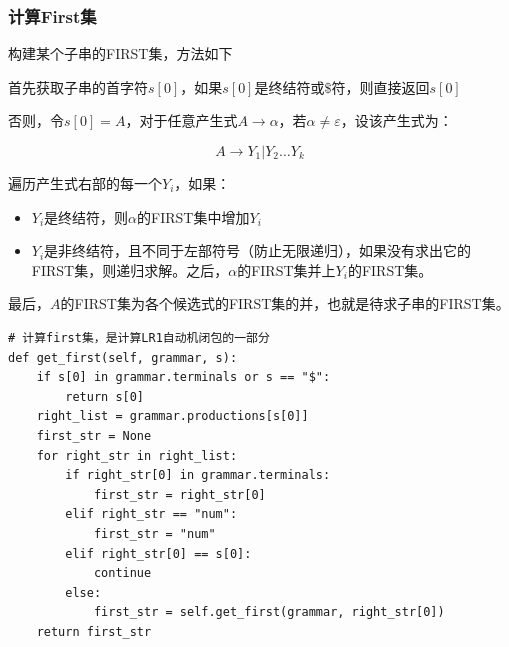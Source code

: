 \documentclass[lang=cn,11pt,a4paper]{elegantpaper}
\begin{document}
\subsubsection{计算First集}

构建某个子串的FIRST集，方法如下

首先获取子串的首字符$s[0]$，如果$s[0]$是终结符或$\$$符，则直接返回$s[0]$

否则，令$s[0] = A$，对于任意产生式$A\rightarrow\alpha$，若$\alpha\not=\varepsilon$，设该产生式为：

$$
    A\rightarrow Y_1 | Y_2\ldots Y_k
$$

遍历产生式右部的每一个$Y_i$，如果：

\begin{itemize}
    \item $Y_i$是终结符，则$\alpha$的FIRST集中增加$Y_i$
    \item $Y_i$是非终结符，且不同于左部符号（防止无限递归），如果没有求出它的FIRST集，则递归求解。之后，$\alpha$的FIRST集并上$Y_i$的FIRST集。
\end{itemize}

最后，$A$的FIRST集为各个候选式的FIRST集的并，也就是待求子串的FIRST集。

\begin{lstlisting}
# 计算first集，是计算LR1自动机闭包的一部分
def get_first(self, grammar, s):
    if s[0] in grammar.terminals or s == "$":
        return s[0]
    right_list = grammar.productions[s[0]]
    first_str = None
    for right_str in right_list:
        if right_str[0] in grammar.terminals:
            first_str = right_str[0]
        elif right_str == "num":
            first_str = "num"
        elif right_str[0] == s[0]:
            continue
        else:
            first_str = self.get_first(grammar, right_str[0])
    return first_str
\end{lstlisting}
\end{document}

